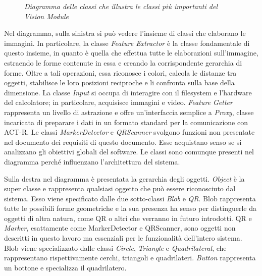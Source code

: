 		\begin{figure}[h]
		  \begin{center} 
		  \end{center} 
		  \caption{\textit{Diagramma delle classi che illustra le classi più importanti del Vision Module}}  
		  \label{fig:classOverviewITA}
	 	\end{figure}	
		
		Nel diagramma, sulla sinistra si può vedere l'insieme di classi che elaborano le immagini.
		In particolare, la classe \emph{Feature Extractor} è la classe fondamentale di questo insieme, in quanto è quella che effettua tutte le elaborazioni sull'immagine, estraendo le forme contenute in essa e creando la corrispondente gerarchia di forme. 
		Oltre a tali operazioni, essa riconosce i colori, calcola le distanze tra oggetti, stabilisce le loro posizioni reciproche e li confronta sulla base della dimensione.
		La classe \emph{Input} si occupa di interagire con il filesystem e l'hardware del calcolatore; in particolare, acquisisce immagini e video.
		\emph{Feature Getter} rappresenta un livello di astrazione e offre un'interfaccia semplice a \emph{Proxy}, classe incaricata di preparare i dati in un formato standard per la comunicazione con \mbox{ACT-R}.
		Le classi \emph{MarkerDetector} e \emph{QRScanner} svolgono funzioni non presentate nel documento dei requisiti di questo documento. Esse acquistano senso se si analizzano gli obiettivi globali del software.
		Le classi sono comunque presenti nel diagramma perché influenzano l'architettura del sistema.

		Sulla destra nel diagramma è presentata la gerarchia degli oggetti.
		\emph{Object} è la super classe e rappresenta qualsiasi oggetto che può essere riconosciuto dal sistema.
		Esso viene specificato dalle due sotto-classi \emph{Blob} e \emph{QR}.
		Blob rappresenta tutte le possibili forme geometriche e la sua presenza ha senso per distinguerle da oggetti di altra natura, come QR o altri che verranno in futuro introdotti.
		QR e \emph{Marker}, esattamente come MarkerDetector e QRScanner, sono oggetti non descritti in questo lavoro ma essenziali per le funzionalità dell'intero sistema.
		Blob viene specializzato dalle classi \emph{Circle}, \emph{Triangle} e \emph{Quadrilateral}, che rappresentano rispettivamente cerchi, triangoli e quadrilateri.
		\emph{Button} rappresenta un bottone e specializza il quadrilatero.



